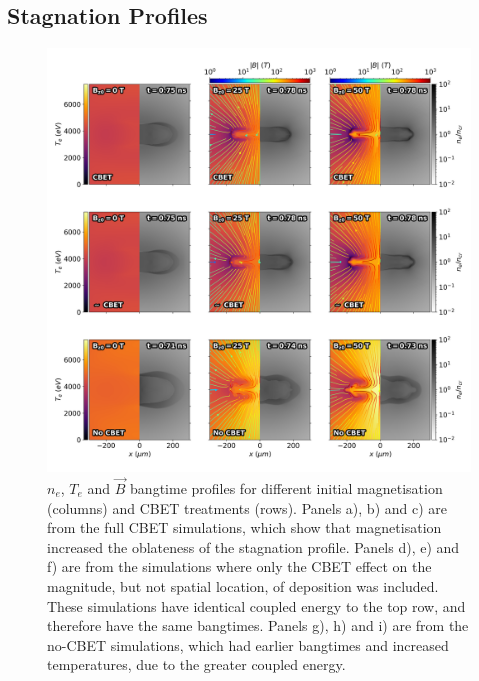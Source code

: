 \subsection{Stagnation Profiles}%
\label{sec:Res2_stgnation_profiles}

\begin{figure}[t!]
    \includegraphics[width=\linewidth]{Results2/Images/allall_stagnation.png}
    \centering
    \caption{$n_e$, $T_e$ and $\vec{B}$ bangtime profiles for different initial magnetisation (columns) and \ac{CBET} treatments (rows).
    Panels a), b) and c) are from the full \ac{CBET} simulations, which show that magnetisation increased the oblateness of the stagnation profile.
    Panels d), e) and f) are from the simulations where only the \ac{CBET} effect on the magnitude, but not spatial location, of deposition was included.
    These simulations have identical coupled energy to the top row, and therefore have the same bangtimes.
    Panels g), h) and i) are from the no-\ac{CBET} simulations, which had earlier bangtimes and increased temperatures, due to the greater coupled energy.}%
    \label{fig:Res2_allall_stagnation}
\end{figure}

